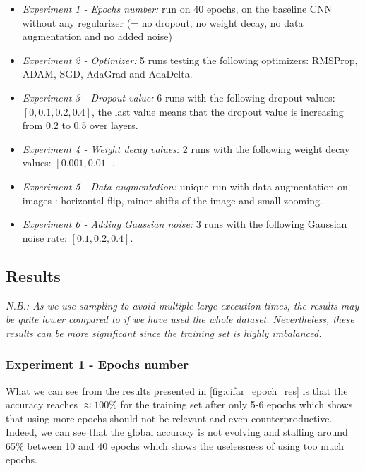 \documentclass[11pt, openany]{report}
\theoremstyle{plain}
\theoremstyle{definition}
\theoremstyle{remark}
\begin{document}
\begin{itemize}
\item \textit{Experiment 1 - Epochs number:} run on 40 epochs, on the baseline CNN without any regularizer (= no dropout, no weight decay, no data augmentation and no added noise) 

\item \textit{Experiment 2 - Optimizer:} 5 runs testing the following optimizers: RMSProp, ADAM, SGD, AdaGrad and AdaDelta. 

\item \textit{Experiment 3 - Dropout value:} 6 runs with the following dropout values: 
\newline $[0, 0.1, 0.2, 0.4]$, the last value means that the dropout value is increasing from 0.2 to 0.5 over layers.
 
\item \textit{Experiment 4 - Weight decay values:} 2 runs with the following weight decay values: $[0.001, 0.01]$.   

\item \textit{Experiment 5 - Data augmentation:} unique run with data augmentation on images : horizontal flip, minor shifts of the image and small zooming.

\item \textit{Experiment 6 - Adding Gaussian noise:} 3 runs with the following Gaussian noise rate: $[0.1, 0.2, 0.4]$.
\end{itemize}

\newpage
\subsection{Results} 

\textit{N.B.: As we use sampling to avoid multiple large execution times, the results may be quite lower compared to if we have used the whole dataset. Nevertheless, these results can be more significant since the training set is highly imbalanced.}    

\subsubsection{Experiment 1 - Epochs number} 
What we can see from the results presented in \autoref{fig:cifar_epoch_res} is that the accuracy reaches $\approx 100\%$ for the training set after only 5-6 epochs which shows that using more epochs should not be relevant and even counterproductive. Indeed, we can see that the global accuracy is not evolving and stalling around 65\% between 10 and 40 epochs which shows the uselessness of using too much epochs. 
\end{document}
